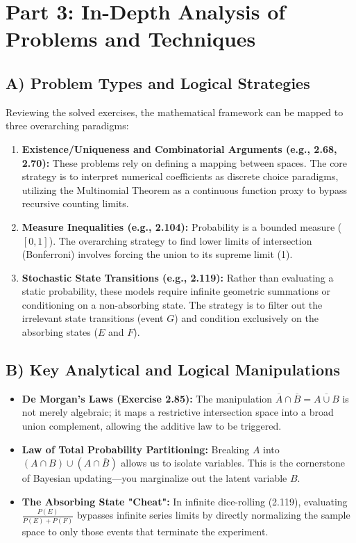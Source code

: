 \documentclass[11pt, letterpaper]{article}
\theoremstyle{definition}
\begin{document}
\newpage
\section{Part 3: In-Depth Analysis of Problems and Techniques}

\subsection{A) Problem Types and Logical Strategies}
Reviewing the solved exercises, the mathematical framework can be mapped to three overarching paradigms:
\begin{enumerate}
    \item \textbf{Existence/Uniqueness and Combinatorial Arguments (e.g., 2.68, 2.70):} These problems rely on defining a mapping between spaces. The core strategy is to interpret numerical coefficients as discrete choice paradigms, utilizing the Multinomial Theorem as a continuous function proxy to bypass recursive counting limits.
    \item \textbf{Measure Inequalities (e.g., 2.104):} Probability is a bounded measure ($[0,1]$). The overarching strategy to find lower limits of intersection (Bonferroni) involves forcing the union to its supreme limit (1).
    \item \textbf{Stochastic State Transitions (e.g., 2.119):} Rather than evaluating a static probability, these models require infinite geometric summations or conditioning on a non-absorbing state. The strategy is to filter out the irrelevant state transitions (event $G$) and condition exclusively on the absorbing states ($E$ and $F$).
\end{enumerate}

\subsection{B) Key Analytical and Logical Manipulations}
\begin{itemize}
    \item \textbf{De Morgan's Laws (Exercise 2.85):} The manipulation $\overline{A} \cap \overline{B} = \overline{A \cup B}$ is not merely algebraic; it maps a restrictive intersection space into a broad union complement, allowing the additive law to be triggered. 
    \item \textbf{Law of Total Probability Partitioning:} Breaking $A$ into $(A \cap B) \cup (A \cap \overline{B})$ allows us to isolate variables. This is the cornerstone of Bayesian updating---you marginalize out the latent variable $B$.
    \item \textbf{The Absorbing State "Cheat":} In infinite dice-rolling (2.119), evaluating $\frac{P(E)}{P(E) + P(F)}$ bypasses infinite series limits by directly normalizing the sample space to only those events that terminate the experiment.
\end{itemize}
\end{document}

